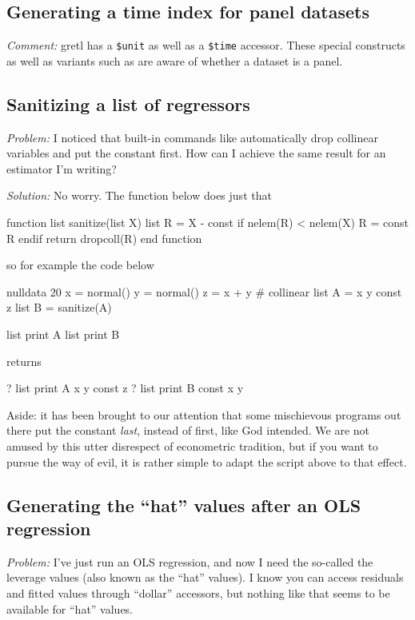 \subsection{Generating a time index for panel datasets}

\emph{Comment:} gretl has a \texttt{\$unit} as well as a \texttt{\$time}
accessor. These special constructs as well as variants such as
 are aware of whether a dataset is a panel.

\subsection{Sanitizing a list of regressors}

\emph{Problem:} I noticed that built-in commands like 
automatically drop collinear variables and put the constant first. How
can I achieve the same result for an estimator I'm writing?

\emph{Solution:}
No worry. The function below does just that
\begin{code}
function list sanitize(list X)
    list R = X - const
    if nelem(R) < nelem(X)
        R = const R
    endif
    return dropcoll(R)
end function
\end{code}
so for example the code below
\begin{code}
nulldata 20
x = normal()
y = normal()
z = x + y # collinear
list A = x y const z
list B = sanitize(A)

list print A
list print B
\end{code}
returns
\begin{code}
? list print A
x y const z
? list print B
const x y
\end{code}

Aside: it has been brought to our attention that some mischievous
programs out there put the constant \emph{last}, instead of first,
like God intended. We are not amused by this utter disrespect of
econometric tradition, but if you want to pursue the way of evil, it
is rather simple to adapt the script above to that effect.


\subsection{Generating the ``hat'' values after an OLS regression}
\label{sec:hatvalues}

\emph{Problem:} I've just run an OLS regression, and now I need the
so-called the leverage values (also known as the ``hat'' values). I
know you can access residuals and fitted values through ``dollar''
accessors, but nothing like that seems to be available for ``hat''
values.

